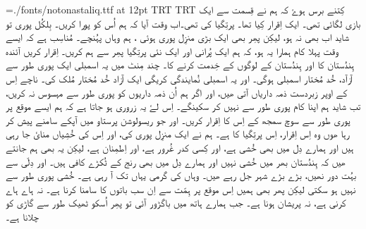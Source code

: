 
\nopagenumbers
\parindent=0mm
\font\noto={./fonts/notonastaliq.ttf} at 12pt
\textdir TRT
\pardir TRT
\noto
کِتنے برس ہوۓ کہ ہم نے قِسمت سے ایک بازی لگائی تھی۔ ایک اِقرار کِیا تھا۔ پرتِگیا کی
تھی۔اب وقت آیا کہ ہم اُس کو پورا کریں۔ بِلکُل پوری تو شاید اب بھی نہ ہو، لیکِن پھِر
بھی ایک بڑی منزِل پوری ہوئی ، ہم وہاں پہُنچے۔ مُناسِب ہے کہ ایسے وقت پہلا کام ہمارا
یہ ہو، کہ ہم ایک پُرانی اور ایک نئی پرتِگیا پھِر سے ہم کریں۔ اِقرار کریں آئندہ
ہِندُستان کا اور ہِندُستان کے لوگوں کے خِدمت کرنے کا۔ چند مِنٹ میں یہ اسمبلی ایک پوری
طور سے آزآد، خُد مُختار اسمبلی ہوگی۔ اور یہ اسمبلی نُمایندگی کریگی ایک آزاد خُد
مُختار مُلک کی۔ ناچے اِس کے اوپر زبردست ذمہ داریاں آتی ھیں، اور اگر ہم اُن ذمہ
داریوں کو پوری طور سے مہسوس نہ کریں، تب شاید ہم اپنا کام پوری طور سے نہیں کر
سکینگے۔ اِس لۓ یہ زروری ہو جاتا ہے کہ ہم ایسے موقع پر پوری طور سے سوچ سمجھ کے اِس
کا اِقرار کریں۔ اور جو ریسولوشن پرستاو میں آپکے سامنے پیش کر رہا ھوں وہ اِس
اِقرار، اِس پرتِگیا کا ہے۔ ہم نے ایک منزِل پوری کی، اور اِس کی خُشِیاں منایٔ جا رہی ہیں
اور ہمارے دِل میں بھی خُشی ہے، اور کِسی کدر غُرور ہے، اور اِطمِنان ہے، لیکِن یہ بھی ہم
جانتے ھیں کہ ہِندُستان بھر میں خُشی نہیں اور ہمارے دِل میں بھی رنج کے ٹُکڑے کافی
ہیں۔ اور دِلّی سے بہُت دور نھیں، بڑے بڑے شہر جل رہے ھیں۔ وہاں کی گرمی یہاں تک آ
رہی ہے۔ خُشی پوری طور سے نہیں ہو سکتی لیکِن پھر بھی ہمیں اِس موقع پر ہِمّت سے اِن سب
باتوں کا سامنا کرنا ہے۔ نہ ہاے ہاے کرنی ہے، نہ پریشان ہونا ہے۔ جب ہمارے ہاتھ
میں باگڑور آئی تو پھِر اُسکو ٹھیک طور سے گاڑی کو چلانا ہے۔
\bye
